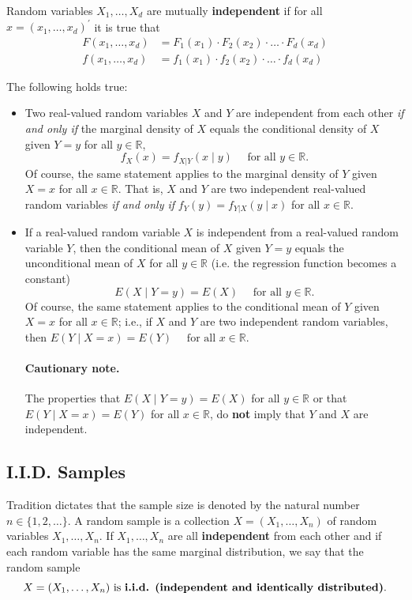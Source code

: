 \documentclass[
  14pt,
]{memoir}
\begin{document}
Random variables \(X_1,\dots,X_d\) are mutually \textbf{independent} if for all \(x=(x_1,\dots,x_d)^\prime\) it is true that
\begin{align*}
  F(x_1,\dots,x_d)&=F_1(x_1)\cdot F_2(x_2)\cdot\ldots\cdot F_d(x_d)\\
  f(x_1,\dots,x_d)&=f_1(x_1)\cdot f_2(x_2)\cdot\ldots\cdot f_d(x_d)
\end{align*}

\noindent The following holds true:

\begin{itemize}
\item  Two real-valued random variables $X$ and $Y$ are independent from each other \textit{if and only if} the marginal density of $X$ equals the conditional density of $X$ given $Y=y$ for all $y\in\mathbb{R}$,
$$f_X(x)=f_{X|Y}(x\mid y)\quad \text{ for all } y\in\mathbb{R}.$$
Of course, the same statement applies to the marginal density of $Y$ given $X=x$ for all $x\in\mathbb{R}$. That is, $X$ and $Y$ are two independent real-valued random variables \textit{if and only if} 
$f_Y(y)=f_{Y|X}(y\mid x)$ for all $x\in\mathbb{R}.$
\item  If a real-valued random variable $X$ is independent from a real-valued random variable $Y$, then the conditional mean of $X$ given $Y=y$ equals the unconditional mean of $X$ for all $y\in\mathbb{R}$ (i.e. the regression function becomes a constant)
$$E(X\mid Y=y)=E(X)\quad \text{ for all } y\in\mathbb{R}.$$
Of course, the same statement applies to the conditional mean of $Y$ given $X=x$ for all $x\in\mathbb{R}$; i.e., if $X$ and $Y$ are two independent random variables, then 
$E(Y\mid X=x)=E(Y)\quad \text{ for all } x\in\mathbb{R}.$\newline
\paragraph*{Cautionary note.} The properties that $E(X\mid Y=y)=E(X)$ for all $y\in\mathbb{R}$ or that $E(Y\mid X=x)=E(Y)$ for all $x\in\mathbb{R}$, do \textbf{not} imply that $Y$ and $X$ are independent. 
\end{itemize}

\hypertarget{i.i.d.-samples}{%
\subsection{I.I.D. Samples}\label{i.i.d.-samples}}

Tradition dictates that the sample size is denoted by the natural number \(n\in\{1,2,\dots\}\). A random sample is a collection \(X=(X_{1}, \ldots, X_{n})\) of random variables \(X_{1}, \ldots, X_{n}\). If \(X_{1}, \ldots, X_{n}\) are all \textbf{independent} from each other and if each random variable has the same marginal distribution, we say that the random sample
\[
X=(X_{1}, \ldots, X_{n})\text{ is \textbf{i.i.d. (independent and identically distributed)}}. 
\]
\end{document}
